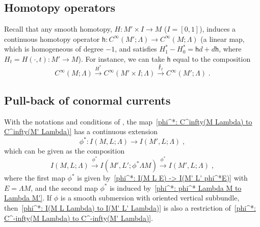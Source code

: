 \documentclass{memo-l}
\theoremstyle{plain}
\theoremstyle{definition}
\theoremstyle{remark}
\newcommand{\sh}{\mathsf{h}}
\numberwithin{section}{chapter}
\numberwithin{equation}{section}%
\begin{document}
\subsection{Homotopy operators}\label{ss: homotopy opers}

Recall that any smooth homotopy, $H:M'\times I\to M$ ($I=[0,1]$), induces a continuous homotopy operator $\sh:C^\infty(M';\Lambda)\to C^\infty(M;\Lambda)$ (a linear map, which is homogeneous of degree $-1$, and satisfies $H_1^*-H_0^*=\sh d+d\sh$, where $H_t=H(\cdot,t):M'\to M$). For instance, we can take $\sh$ equal to the composition \cite[Section~4]{BottTu1982}
\begin{equation}\label{sh = fint_I H^*}
C^\infty(M;\Lambda) \xrightarrow{H^*} C^\infty(M'\times I;\Lambda)
\xrightarrow{\fint_I} C^\infty(M';\Lambda)\;.
\end{equation}



\subsection{Pull-back of conormal currents}\label{ss: pull-back of conormal currents}

With the notations and conditions of , the map~\eqref{phi^*: C^infty(M Lambda) to C^infty(M' Lambda)} has a continuous extension
\begin{equation}\label{phi^*: I(M L Lambda) to I(M' L' Lambda)}
\phi^*:I(M,L;\Lambda)\to I(M',L;\Lambda)\;,
\end{equation}
which can be given as the composition
\begin{equation}\label{composition - pull-back - conormal currents}
I(M,L;\Lambda)\xrightarrow{\phi^*}I(M',L';\phi^*\Lambda M)\xrightarrow{\phi^*}I(M',L;\Lambda)\;,
\end{equation}
where the first map $\phi^*$ is given by~\eqref{phi^*: I(M L E) -> I(M' L' phi^*E)} with $E=\Lambda M$, and the second map $\phi^*$ is induced by~\eqref{phi^*: phi^* Lambda M to Lambda M'}. If $\phi$ is a smooth submersion with oriented vertical subbundle, then~\eqref{phi^*: I(M L Lambda) to I(M' L' Lambda)} is also a restriction of~\eqref{phi^*: C^-infty(M Lambda) to C^-infty(M' Lambda)}.
\end{document}
